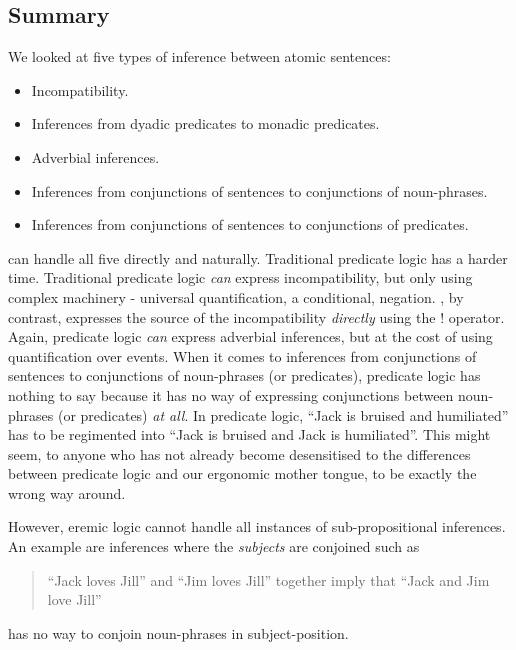 \subsection{Summary}
We looked at five types of inference between atomic
sentences:
\begin{itemize}

\item Incompatibility.
\item Inferences from dyadic predicates to monadic predicates.
\item Adverbial inferences.
\item Inferences from conjunctions of sentences to conjunctions of noun-phrases.
\item Inferences from conjunctions of sentences to conjunctions of predicates.

\end{itemize}

\NI \ELFULL{} can handle all five directly and naturally.  Traditional
predicate logic has a harder time.  Traditional predicate logic
\emph{can} express incompatibility, but only using complex machinery -
universal quantification, a conditional, negation. \ELFULL{}, by
contrast, expresses the source of the incompatibility \emph{directly}
using the $!$ operator.  Again, predicate logic \emph{can} express
adverbial inferences, but at the cost of using quantification over
events.  When it comes to inferences from conjunctions of sentences to
conjunctions of noun-phrases (or predicates), predicate logic has
nothing to say because it has no way of expressing conjunctions
between noun-phrases (or predicates) \emph{at all}. In predicate
logic, ``Jack is bruised and humiliated'' has to be regimented into
``Jack is bruised and Jack is humiliated''.  This might seem, to
anyone who has not already become desensitised to the differences
between predicate logic and our ergonomic mother tongue, to be exactly
the wrong way around.

However, eremic logic cannot handle all instances of sub-propositional inferences.
An example are inferences where the \emph{subjects} are conjoined such  as
\begin{quote}
``Jack loves Jill'' and ``Jim loves Jill'' together imply that ``Jack and Jim love Jill''
\end{quote}

\NI \ELFULL{} has no way to conjoin noun-phrases in subject-position.

